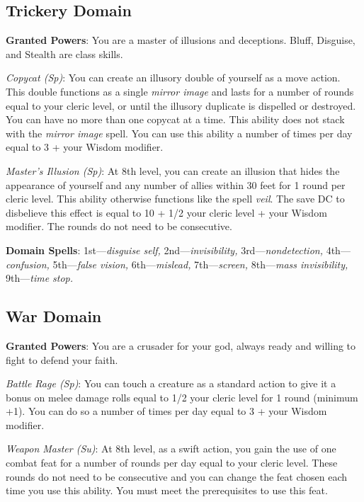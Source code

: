 \subsection{Trickery Domain}

				
\textbf{Granted Powers}: You are a master of illusions and deceptions. Bluff, Disguise, and Stealth are class skills.
				
\textit{Copycat (Sp)}: You can create an illusory double of yourself as a move action. This double functions as a single \textit{mirror image} and lasts for a number of rounds equal to your cleric level, or until the illusory duplicate is dispelled or destroyed. You can have no more than one copycat at a time. This ability does not stack with the \textit{mirror image} spell. You can use this ability a number of times per day equal to 3 + your Wisdom modifier.
				
\textit{Master's Illusion (Sp)}: At 8th level, you can create an illusion that hides the appearance of yourself and any number of allies within 30 feet for 1 round per cleric level. This ability otherwise functions like the spell \textit{veil}. The save DC to disbelieve this effect is equal to 10 + 1/2 your cleric level + your Wisdom modifier. The rounds do not need to be consecutive.
				
\textbf{Domain Spells}: 1st---\textit{disguise self, }2nd---\textit{invisibility,} 3rd---\textit{nondetection, }4th---\textit{confusion, }5th---\textit{false vision, }6th---\textit{mislead, }7th---\textit{screen, }8th---\textit{mass invisibility, }9th---\textit{time stop.}
				
\subsection{War Domain}

				
\textbf{Granted Powers}: You are a crusader for your god, always ready and willing to fight to defend your faith.
				
\textit{Battle Rage (Sp)}: You can touch a creature as a standard action to give it a bonus on melee damage rolls equal to 1/2 your cleric level for 1 round (minimum +1). You can do so a number of times per day equal to 3 + your Wisdom modifier.
				
\textit{Weapon Master (Su)}: At 8th level, as a swift action, you gain the use of one combat feat for a number of rounds per day equal to your cleric level. These rounds do not need to be consecutive and you can change the feat chosen each time you use this ability. You must meet the prerequisites to use this feat.
				
